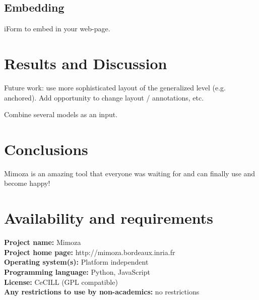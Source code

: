 \documentclass{bmcart}
\begin{document}
\subsection*{Embedding}
iForm to embed in your web-page.

 
\section*{Results and Discussion}

Future work: use more sophisticated layout of the generalized level (e.g. anchored).
Add opportunity to change layout / annotations, etc.

Combine several models as an input.

\section*{Conclusions}

Mimoza is an amazing tool that everyone was waiting for and can finally use and become happy!

\section*{Availability and requirements}
\textbf{Project name:} Mimoza\\
\textbf{Project home page:} http://mimoza.bordeaux.inria.fr\\
\textbf{Operating system(s):} Platform independent\\
\textbf{Programming language:} Python, JavaScript\\
\textbf{License:} CeCILL (GPL compatible)\\
\textbf{Any restrictions to use by non-academics:} no restrictions

\end{document}
